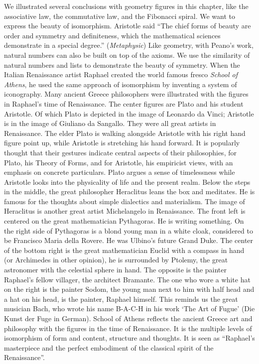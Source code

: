 \documentclass[b5paper]{article}
\begin{document}
We illustrated several conclusions with geometry figures in this chapter, like the associative law, the commutative law, and the Fibonacci spiral. We want to express the beauty of isomorphism. Aristotle said
``The chief forms of beauty are order and symmetry and definiteness, which the mathematical sciences demonstrate in a special degree.'' ({\em Metaphysic}) Like geometry, with Peano's work, natural numbers can also be built on top of the axioms. We use the similarity of natural numbers and lists to demonstrate the beauty of symmetry. When the Italian Renaissance artist Raphael created the world famous fresco {\em School of Athens}, he used the same approach of isomorphism by inventing a system of iconography. Many ancient Greece philosophers were illustrated with the figures in Raphael's time of Renaissance. The center figures are Plato and his student Aristotle. Of which Plato is depicted in the image of Leonardo da Vinci; Aristotle is in the image of Giuliano da Sangallo. They were all great artists in Renaissance. The elder Plato is walking alongside Aristotle with his right hand figure point up, while Aristotle is stretching his hand forward. It is popularly thought that their gestures indicate central aspects of their philosophies, for Plato, his Theory of Forms, and for Aristotle, his empiricist views, with an emphasis on concrete particulars. Plato argues a sense of timelessness while Aristotle looks into the physicality of life and the present realm. Below the steps in the middle, the great philosopher Heraclitus leans the box and meditates. He is famous for the thoughts about simple dialectics and materialism. The image of Heraclitus is another great artist Michelangelo in Renaissance. The front left is centered on the great mathematician Pythagoras. He is writing something. On the right side of Pythagoras is a blond young man in a white cloak, considered to be Francisco Maria della Rovere. He was Ulbino's future Grand Duke. The center of the bottom right is the great mathematician Euclid with a compass in hand (or Archimedes in other opinion), he is surrounded by Ptolemy, the great astronomer with the celestial sphere in hand. The opposite is the painter Raphael's fellow villager, the architect Bramante. The one who wore a white hat on the right is the painter Sodom, the young man next to him with half head and a hat on his head, is the painter, Raphael himself. This reminds us the great musician Bach, who wrote his name B-A-C-H in his work `The Art of Fugue' (Die Kunst der Fuge in German). School of Athens reflects the ancient Greece art and philosophy with the figures in the time of Renaissance. It is the multiple levels of isomorphism of form and content, structure and thoughts. It is seen as ``Raphael's masterpiece and the perfect embodiment of the classical spirit of the Renaissance''.
\end{document}
